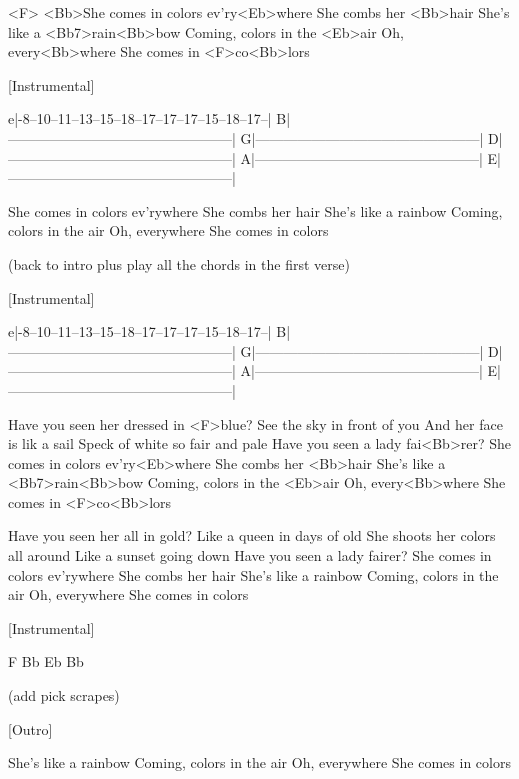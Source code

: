 

\zr
<F>    <Bb>She comes in colors ev'ry<Eb>where
She combs her <Bb>hair
She's like a <Bb7>rain<Bb>bow
Coming, colors in the <Eb>air
Oh, every<Bb>where
She comes in <F>co<Bb>lors
\kr

[Instrumental]
                                                      
e|-8--10--11--13--15--18--17--17--17--15--18--17--| 
B|------------------------------------------------|  
G|------------------------------------------------|  
D|------------------------------------------------|
A|------------------------------------------------|
E|------------------------------------------------|

\zs
She comes in colors ev'rywhere
She combs her hair
She's like a rainbow
Coming, colors in the air
Oh, everywhere
She comes in colors          

(back to intro plus play all the chords
in the first verse)


[Instrumental]
                                                      
e|-8--10--11--13--15--18--17--17--17--15--18--17--| 
B|------------------------------------------------|  
G|------------------------------------------------|  
D|------------------------------------------------|
A|------------------------------------------------|
E|------------------------------------------------|


Have you seen her dressed in <F>blue?
See the sky in front of you
And her face is lik a sail
Speck of white so fair and pale
Have you seen a lady fai<Bb>rer?
She comes in colors ev'ry<Eb>where
She combs her <Bb>hair
She's like a <Bb7>rain<Bb>bow
Coming, colors in the <Eb>air
Oh, every<Bb>where
She comes in <F>co<Bb>lors


\zs
Have you seen her all in gold?
Like a queen in days of old
She shoots her colors all around
Like a sunset going down
Have you seen a lady fairer?
She comes in colors ev'rywhere
She combs her hair
She's like a rainbow
Coming, colors in the air
Oh, everywhere
She comes in colors      
\ks

[Instrumental]
                                                      
F  Bb    Eb   Bb

(add pick scrapes)


[Outro]

She's like a rainbow
Coming, colors in the air
Oh, everywhere
She comes in colors
\kp

